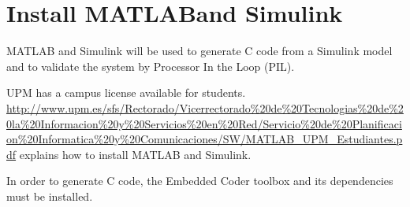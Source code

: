 \section{Install MATLAB\texttrademark and Simulink\texttrademark}

MATLAB and Simulink will be used to generate C code from a Simulink model and 
to validate the system by Processor In the Loop (PIL).

UPM has a campus license available for students. \url{http://www.upm.es/sfs/Rectorado/Vicerrectorado\%20de\%20Tecnologias\%20de\%20la\%20Informacion\%20y\%20Servicios\%20en\%20Red/Servicio\%20de\%20Planificacion\%20Informatica\%20y\%20Comunicaciones/SW/MATLAB_UPM_Estudiantes.pdf} explains how to install MATLAB and Simulink.

In order to generate C code, the Embedded Coder toolbox and its dependencies must be installed.
